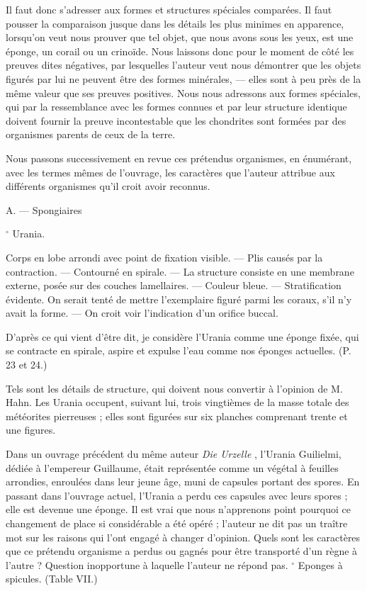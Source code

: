 \documentclass[a4paper, 12pt, oneside, french]{book}
\begin{document}
Il faut donc s'adresser aux formes et structures spéciales comparées. Il faut pousser la comparaison jusque dans les détails les plus minimes en apparence, lorsqu'on veut nous prouver que tel objet, que nous avons sous les yeux, est une éponge, un corail ou un crinoïde. Nous laissons donc pour le moment de côté les preuves dites négatives, par lesquelles l'auteur veut nous démontrer que les objets figurés par lui ne peuvent être des formes minérales, --- elles sont à peu près de la même valeur que ses preuves positives. Nous nous adressons aux formes spéciales, qui par la ressemblance avec les formes connues et par leur structure identique doivent fournir la preuve incontestable que les chondrites sont formées par des organismes parents de ceux de la terre.

Nous passons successivement en revue ces prétendus organismes, en énumérant, avec les termes mêmes de l'ouvrage, les caractères que l'auteur attribue aux différents organismes qu'il croit avoir reconnus.

\og A. --- Spongiaires \fg

$^{\circ}$ Urania. \fg

\og Corps en lobe arrondi avec point de fixation visible. \fg --- \og Plis causés par la contraction. \fg --- \og Contourné en spirale. \fg --- \og La structure consiste en une membrane externe, posée sur des couches lamellaires. \fg --- \og Couleur bleue. \fg --- \og Stratification évidente. On serait tenté de mettre l'exemplaire figuré parmi les coraux, s'il n'y avait la forme. \fg --- \og On croit voir l'indication d'un orifice buccal. \fg

\og D'après ce qui vient d'être dit, je considère l'Urania comme une éponge fixée, qui se contracte en spirale, aspire et expulse l'eau comme nos éponges actuelles. \fg (P. 23 et 24.)

Tels sont les détails de structure, qui doivent nous convertir à l'opinion de M. Hahn. Les Urania occupent, suivant lui, trois vingtièmes de la masse totale des météorites pierreuses ; elles sont figurées sur six planches comprenant trente et une figures.

Dans un ouvrage précédent du même auteur \emph{Die Urzelle} \fg, l'Urania Guilielmi, dédiée à l'empereur Guillaume, était représentée comme un végétal à feuilles arrondies, enroulées dans leur jeune âge, muni de capsules portant des spores. En passant dans l'ouvrage actuel, l'Urania a perdu ces capsules avec leurs spores ; elle est devenue une éponge. Il est vrai que nous n'apprenons point pourquoi ce changement de place si considérable a été opéré ; l'auteur ne dit pas un traître mot sur les raisons qui l'ont engagé à changer d'opinion. Quels sont les caractères que ce prétendu organisme a perdus ou gagnés pour être transporté d'un règne à l'autre ? Question inopportune à laquelle l'auteur ne répond pas.
$^{\circ}$ Eponges à spicules. \fg (Table VII.)
\end{document}
